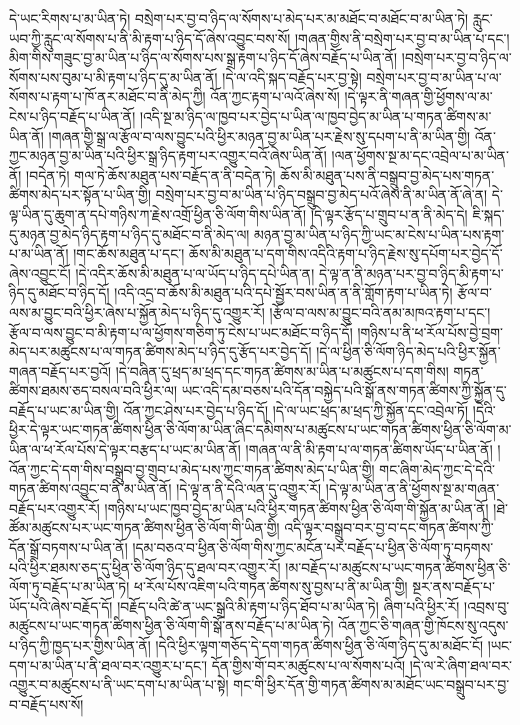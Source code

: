 དེ་ཡང་རིགས་པ་མ་ཡིན་ཏེ། བསྲེག་པར་བྱ་བ་ཉིད་ལ་སོགས་པ་མེད་པར་མ་མཐོང་བ་མཐོང་བ་མ་ཡིན་ཏེ། རླུང་ཡབ་ཀྱི་རླུང་ལ་སོགས་པ་ནི་མི་རྟག་པ་ཉིད་དོ་ཞེས་འབྱུང་བས་སོ། །གཞན་གྱིས་ནི་བསྲེག་པར་བྱ་བ་མ་ཡིན་པ་དང་། མིག་གིས་གཟུང་བྱ་མ་ཡིན་པ་ཉིད་ལ་སོགས་པས་སྒྲ་རྟག་པ་ཉིད་དོ་ཞེས་བརྗོད་པ་ཡིན་ནོ། །བསྲེག་པར་བྱ་བ་ཉིད་ལ་སོགས་པས་བུམ་པ་མི་རྟག་པ་ཉིད་དུ་མ་ཡིན་ནོ། །དེ་ལ་འདི་སྐད་བརྗོད་པར་བྱ་སྟེ། བསྲེག་པར་བྱ་བ་མ་ཡིན་པ་ལ་སོགས་པ་རྟག་པ་ཁོ་ནར་མཐོང་བ་ནི་མེད་ཀྱི། འོན་ཀྱང་རྟག་པ་ལའོ་ཞེས་སོ། །དེ་ལྟར་ནི་གཞན་གྱི་ཕྱོགས་ལ་མ་ངེས་པ་ཉིད་བརྗོད་པ་ཡིན་ནོ། །འདི་སྔ་མ་ཉིད་ལ་ཁྱབ་པར་བྱེད་པ་ཡིན་ལ་ཁྱབ་བྱེད་མ་ཡིན་པ་གཏན་ཚིགས་མ་ཡིན་ནོ། །གཞན་གྱི་སྒྲ་ལ་རྩོལ་བ་ལས་བྱུང་པའི་ཕྱིར་མཉན་བྱ་མ་ཡིན་པར་རྗེས་སུ་དཔག་པ་ནི་མ་ཡིན་གྱི། འོན་ཀྱང་མཉན་བྱ་མ་ཡིན་པའི་ཕྱིར་སྒྲ་ཉིད་རྟག་པར་འགྱུར་བའོ་ཞེས་ཡིན་ནོ། །ལན་ཕྱོགས་སྔ་མ་དང་འབྲེལ་པ་མ་ཡིན་ནོ། །བདེན་ཏེ། གལ་ཏེ་ཆོས་མཐུན་པས་བརྗོད་ན་ནི་བདེན་ཏེ། ཆོས་མི་མཐུན་པས་ནི་བསྒྲུབ་བྱ་མེད་པས་གཏན་ཚིགས་མེད་པར་སྟོན་པ་ཡིན་གྱི། བསྲེག་པར་བྱ་བ་མ་ཡིན་པ་ཉིད་བསྒྲུབ་བྱ་མེད་པའོ་ཞེས་ནི་མ་ཡིན་ནོ་ཞེ་ན། དེ་ལྟ་ཡིན་དུ་ཆུག་ན་དཔེ་གཉིས་ཀ་རྗེས་འགྲོ་ཕྱིན་ཅི་ལོག་གིས་ཡིན་ནོ། །དེ་ལྟར་རྩོད་པ་གྲུབ་པ་ན་ནི་མེད་དེ། ཇི་སྐད་དུ་མཉན་བྱ་མེད་ཉིད་རྟག་པ་ཉིད་དུ་མཐོང་བ་ནི་མེད་ལ། མཉན་བྱ་མ་ཡིན་པ་ཉིད་ཀྱི་ཡང་མ་ངེས་པ་ཡིན་པས་རྟག་པ་མ་ཡིན་ནོ། །གང་ཆོས་མཐུན་པ་དང་། ཆོས་མི་མཐུན་པ་དག་གིས་འདིའི་རྟག་པ་ཉིད་རྗེས་སུ་དཔོག་པར་བྱེད་དོ་ཞེས་འབྱུང་ངོ། །དེ་འདིར་ཆོས་མི་མཐུན་པ་ལ་ཡོད་པ་ཉིད་དཔེ་ཡིན་ན། དེ་ལྟ་ན་ནི་མཉན་པར་བྱ་བ་ཉིད་མི་རྟག་པ་ཉིད་དུ་མཐོང་བ་ཉིད་དོ། །འདི་འདྲ་བ་ཆོས་མི་མཐུན་པའི་དཔེ་སྦྱོར་བས་ཡིན་ན་ནི་གློག་རྟག་པ་ཡིན་ཏེ། རྩོལ་བ་ལས་མ་བྱུང་བའི་ཕྱིར་ཞེས་པ་སྐྱོན་མེད་པ་ཉིད་དུ་འགྱུར་རོ། །རྩོལ་བ་ལས་མ་བྱུང་བའི་ནམ་མཁའ་རྟག་པ་དང་། རྩོལ་བ་ལས་བྱུང་བ་མི་རྟག་པ་ལ་ཕྱོགས་གཅིག་ཏུ་ངེས་པ་ཡང་མཐོང་བ་ཉིད་དོ། །གཉིས་པ་ནི་ཕ་རོལ་པོས་བྱེ་བྲག་མེད་པར་མཚུངས་པ་ལ་གཏན་ཚིགས་མེད་པ་ཉིད་དུ་རྩོད་པར་བྱེད་དོ། །དེ་ལ་ཕྱིན་ཅི་ལོག་ཉིད་མེད་པའི་ཕྱིར་སྐྱོན་གཞན་བརྗོད་པར་བྱའོ། །དེ་བཞིན་དུ་ཕྲད་མ་ཕྲད་དང་གཏན་ཚིགས་མ་ཡིན་པ་མཚུངས་པ་དག་གིས། གཏན་ཚིགས་ཐམས་ཅད་བསལ་བའི་ཕྱིར་ལ། ཡང་འདི་དམ་བཅས་པའི་དོན་བསྐྱེད་པའི་སྒོ་ནས་གཏན་ཚིགས་ཀྱི་སྐྱོན་དུ་བརྗོད་པ་ཡང་མ་ཡིན་གྱི། འོན་ཀྱང་ཤེས་པར་བྱེད་པ་ཉིད་དོ། །དེ་ལ་ཡང་ཕྲད་མ་ཕྲད་ཀྱི་སྐྱོན་དང་འབྲེལ་ཏོ། །དེའི་ཕྱིར་དེ་ལྟར་ཡང་གཏན་ཚིགས་ཕྱིན་ཅི་ལོག་མ་ཡིན་ཞིང་དམིགས་པ་མཚུངས་པ་ཡང་གཏན་ཚིགས་ཕྱིན་ཅི་ལོག་མ་ཡིན་ལ་ཕ་རོལ་པོས་དེ་ལྟར་བརྩད་པ་ཡང་མ་ཡིན་ནོ། །གཞན་ལ་ནི་མི་རྟག་པ་ལ་གཏན་ཚིགས་ཡོད་པ་ཡིན་ནོ། །འོན་ཀྱང་དེ་དག་གིས་བསྒྲུབ་བྱ་གྲུབ་པ་མེད་པས་ཀྱང་གཏན་ཚིགས་མེད་པ་ཡིན་གྱི། གང་ཞིག་མེད་ཀྱང་དེ་དེའི་གཏན་ཚིགས་འབྱུང་བ་ནི་མ་ཡིན་ནོ། །དེ་ལྟ་ན་ནི་དེའི་ལན་དུ་འགྱུར་རོ། །དེ་ལྟ་མ་ཡིན་ན་ནི་ཕྱོགས་སྔ་མ་གཞན་བརྗོད་པར་འགྱུར་རོ། །གཉིས་པ་ཡང་ཁྱབ་བྱེད་མ་ཡིན་པའི་ཕྱིར་གཏན་ཚིགས་ཕྱིན་ཅི་ལོག་གི་སྐྱོན་མ་ཡིན་ནོ། །ཐེ་ཚོམ་མཚུངས་པར་ཡང་གཏན་ཚིགས་ཕྱིན་ཅི་ལོག་གི་ཡིན་གྱི། འདི་ལྟར་བསྒྲུབ་བར་བྱ་བ་དང་གཏན་ཚིགས་ཀྱི་དོན་སྒྲོ་བཏགས་པ་ཡིན་ནོ། །དམ་བཅའ་བ་ཕྱིན་ཅི་ལོག་གིས་ཀྱང་མངོན་པར་བརྗོད་པ་ཕྱིན་ཅི་ལོག་ཏུ་བཏགས་པའི་ཕྱིར་ཐམས་ཅད་དུ་ཕྱིན་ཅི་ལོག་ཉིད་དུ་ཐལ་བར་འགྱུར་རོ། །མ་བརྗོད་པ་མཚུངས་པ་ཡང་གཏན་ཚིགས་ཕྱིན་ཅི་ལོག་ཏུ་བརྗོད་པ་མ་ཡིན་ཏེ། ཕ་རོལ་པོས་འཇིག་པའི་གཏན་ཚིགས་སུ་བྱས་པ་ནི་མ་ཡིན་གྱི། སྔར་ནས་བརྗོད་པ་ཡོད་པའི་ཞེས་བརྗོད་དོ། །བརྗོད་པའི་ཚེ་ན་ཡང་སྒྲའི་མི་རྟག་པ་ཉིད་ཐོབ་པ་མ་ཡིན་ཏེ། ཞིག་པའི་ཕྱིར་རོ། །འབྲས་བུ་མཚུངས་པ་ཡང་གཏན་ཚིགས་ཕྱིན་ཅི་ལོག་གི་སྒོ་ནས་བརྗོད་པ་མ་ཡིན་ཏེ། འོན་ཀྱང་ཅི་གཞན་གྱི་ཁོངས་སུ་འདུས་པ་ཉིད་ཀྱི་ཁྱད་པར་གྱིས་ཡིན་ནོ། །དེའི་ཕྱིར་ལྟག་གཅོད་དེ་དག་གཏན་ཚིགས་ཕྱིན་ཅི་ལོག་ཉིད་དུ་མ་མཐོང་ངོ། །ཡང་དག་པ་མ་ཡིན་པ་ནི་ཐལ་བར་འགྱུར་པ་དང་། དོན་གྱིས་གོ་བར་མཚུངས་པ་ལ་སོགས་པའོ། །དེ་ལ་རེ་ཞིག་ཐལ་བར་འགྱུར་བ་མཚུངས་པ་ནི་ཡང་དག་པ་མ་ཡིན་པ་སྟེ། གང་གི་ཕྱིར་དོན་གྱི་གཏན་ཚིགས་མ་མཐོང་ཡང་བསྒྲུབ་པར་བྱ་བ་བརྗོད་པས་སོ། 